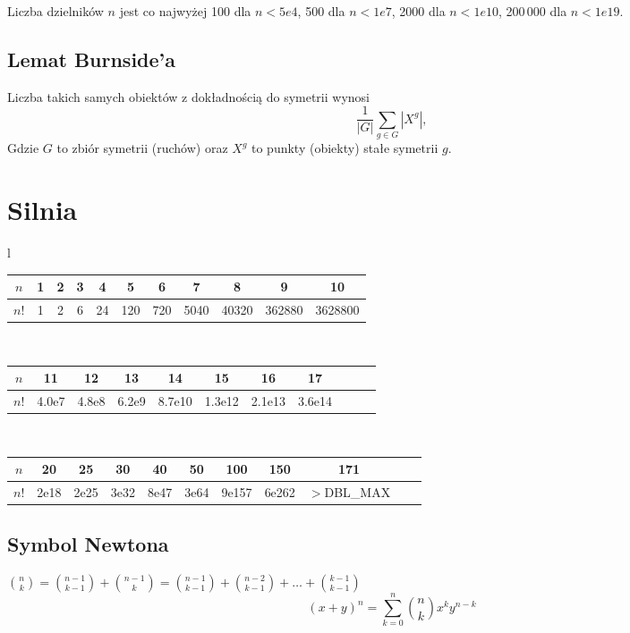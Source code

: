 	Liczba dzielników $n$ jest co najwyżej 100 dla $n < 5e4$, 500 dla $n < 1e7$, 2000 dla $n < 1e10$, 200\,000 dla $n < 1e19$.


	\subsection{Lemat Burnside'a}
		Liczba takich samych obiektów z dokładnością do symetrii wynosi
		 \[ {\frac {1}{|G|}}\sum _{{g\in G}}|X^{g}|, \]
		Gdzie $G$ to zbiór symetrii (ruchów) oraz $X^g$ to punkty (obiekty) stałe symetrii $g$.

\section{Silnia}
		\begin{center}
			\begin{tabular}{l}
				\begin{tabular}{c|c@{\ }c@{\ }c@{\ }c@{\ }c@{\ }c@{\ }c@{\ }c@{\ }c@{\ }c}
					$n$  & 1 & 2 & 3 & 4  & 5   & 6   & 7    & 8     & 9      & 10\\
					\hline
					$n!$ & 1 & 2 & 6 & 24 & 120 & 720 & 5040 & 40320 & 362880 & 3628800\\
				\end{tabular}\\
					\begin{tabular}{c|c@{\ }c@{\ }c@{\ }c@{\ }c@{\ }c@{\ }c@{\ }c@{\ }c@{\ }c}
					$n$  & 11    & 12    & 13    & 14     & 15     & 16     & 17\\
					\hline
					$n!$ & 4.0e7 & 4.8e8 & 6.2e9 & 8.7e10 & 1.3e12 & 2.1e13 & 3.6e14\\
				\end{tabular}\\
				\begin{tabular}{c|c@{\ }c@{\ }c@{\ }c@{\ }c@{\ }c@{\ }c@{\ }c@{\ }c@{\ }c}
					$n$  & 20   & 25   & 30   & 40   & 50   & 100   & 150   & 171\\
					\hline
					$n!$ & 2e18 & 2e25 & 3e32 & 8e47 & 3e64 & 9e157 & 6e262 & \scriptsize{$>$DBL\_MAX}\\
				\end{tabular}
			\end{tabular}
		\end{center}

	\subsection{Symbol Newtona}
		$ \binom{n}{k}=\binom{n-1}{k-1}+\binom{n-1}{k}=\binom{n-1}{k-1}+\binom{n-2}{k-1}+\dots+\binom{k-1}{k-1}$
		$$ (x+y)^n=\sum_{k=0}^n \binom{n}{k} x^k y^{n-k} $$

